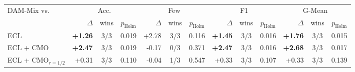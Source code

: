 \begin{tabular}{lrccrccrccrcc}
\toprule
DAM-Mix vs. & \multicolumn{3}{c}{Acc.} & \multicolumn{3}{c}{Few} & \multicolumn{3}{c}{F1} & \multicolumn{3}{c}{G-Mean} \\
 & $\Delta$ & wins & $p_{\mathrm{Holm}}$ & $\Delta$ & wins & $p_{\mathrm{Holm}}$ & $\Delta$ & wins & $p_{\mathrm{Holm}}$ & $\Delta$ & wins & $p_{\mathrm{Holm}}$ \\
\midrule
ECL & \textbf{+1.26} & 3/3 & 0.019 & +2.78 & 3/3 & 0.116 & \textbf{+1.45} & 3/3 & 0.016 & \textbf{+1.76} & 3/3 & 0.015 \\
ECL + CMO & \textbf{+2.47} & 3/3 & 0.019 & -0.17 & 0/3 & 0.371 & \textbf{+2.47} & 3/3 & 0.016 & \textbf{+2.68} & 3/3 & 0.017 \\
ECL + CMO$_{r=1/2}$ & +0.31 & 3/3 & 0.110 & -0.04 & 1/3 & 0.547 & +0.33 & 3/3 & 0.107 & +0.33 & 3/3 & 0.139 \\
\bottomrule
\end{tabular}
